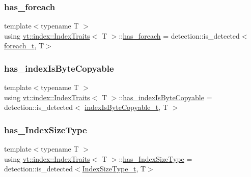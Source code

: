 \subsubsection{\texorpdfstring{has\+\_\+foreach}{has\_foreach}}
{\footnotesize\ttfamily template$<$typename T $>$ \\
using \hyperlink{structvt_1_1index_1_1_index_traits}{vt\+::index\+::\+Index\+Traits}$<$ T $>$\+::\hyperlink{structvt_1_1index_1_1_index_traits_ae82fe931c4bbe8201d4dc72f07ceb42d}{has\+\_\+foreach} =  detection\+::is\+\_\+detected$<$\hyperlink{structvt_1_1index_1_1_index_traits_a132ed4a131bbc5f9e410e203cf2e08ae}{foreach\+\_\+t}, T$>$}

\mbox{\label{structvt_1_1index_1_1_index_traits_ab2daf95703112e971bfc12704a1fa141}} 
\subsubsection{\texorpdfstring{has\+\_\+index\+Is\+Byte\+Copyable}{has\_indexIsByteCopyable}}
{\footnotesize\ttfamily template$<$typename T $>$ \\
using \hyperlink{structvt_1_1index_1_1_index_traits}{vt\+::index\+::\+Index\+Traits}$<$ T $>$\+::\hyperlink{structvt_1_1index_1_1_index_traits_ab2daf95703112e971bfc12704a1fa141}{has\+\_\+index\+Is\+Byte\+Copyable} =  detection\+::is\+\_\+detected$<$ \hyperlink{structvt_1_1index_1_1_index_traits_a67b716eec3bb224751d83b4f1e4d61fc}{index\+Is\+Byte\+Copyable\+\_\+t}, T $>$}

\mbox{\label{structvt_1_1index_1_1_index_traits_ad4433ee81a5b60b9d300efcec8b97181}} 
\subsubsection{\texorpdfstring{has\+\_\+\+Index\+Size\+Type}{has\_IndexSizeType}}
{\footnotesize\ttfamily template$<$typename T $>$ \\
using \hyperlink{structvt_1_1index_1_1_index_traits}{vt\+::index\+::\+Index\+Traits}$<$ T $>$\+::\hyperlink{structvt_1_1index_1_1_index_traits_ad4433ee81a5b60b9d300efcec8b97181}{has\+\_\+\+Index\+Size\+Type} =  detection\+::is\+\_\+detected$<$\hyperlink{structvt_1_1index_1_1_index_traits_a583a777d70fc52ccfe1083acabc9640f}{Index\+Size\+Type\+\_\+t}, T$>$}

